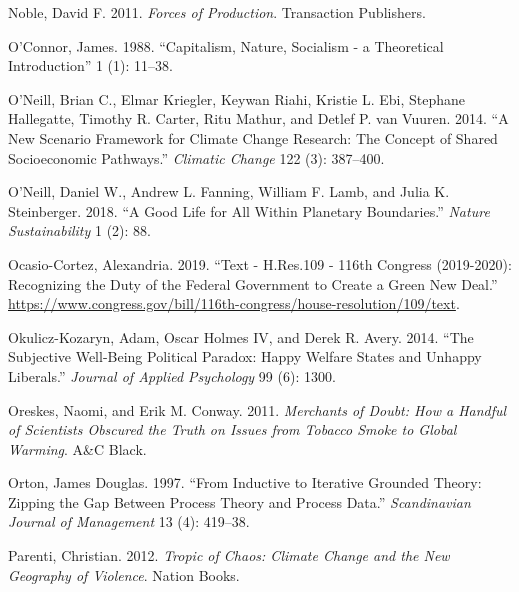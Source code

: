 \documentclass[a4paper, nobind]{templates/ociamthesis}
\newlength{\cslhangindent}
\newenvironment{CSLReferences}[2] %
 {%
  \setlength{\parindent}{0pt}
  \ifodd #1
  \let\oldpar\par
  \def\par{\hangindent=\cslhangindent\oldpar}
  \fi
  \setlength{\parskip}{1mm}
  \setlength{\baselineskip}{6mm}
 }%
 {}
\begin{document}
\begin{CSLReferences}{1}{0}
\leavevmode{}%
Noble, David F. 2011. \emph{Forces of {Production}}. {Transaction Publishers}.

\leavevmode{}%
O'Connor, James. 1988. {``Capitalism, Nature, Socialism - a Theoretical Introduction''} 1 (1): 11--38.

\leavevmode{}%
O'Neill, Brian C., Elmar Kriegler, Keywan Riahi, Kristie L. Ebi, Stephane Hallegatte, Timothy R. Carter, Ritu Mathur, and Detlef P. van Vuuren. 2014. {``A New Scenario Framework for Climate Change Research: The Concept of Shared Socioeconomic Pathways.''} \emph{Climatic Change} 122 (3): 387--400.

\leavevmode{}%
O'Neill, Daniel W., Andrew L. Fanning, William F. Lamb, and Julia K. Steinberger. 2018. {``A Good Life for All Within Planetary Boundaries.''} \emph{Nature Sustainability} 1 (2): 88.

\leavevmode{}%
Ocasio-Cortez, Alexandria. 2019. {``Text - {H}.{Res}.109 - 116th {Congress} (2019-2020): {Recognizing} the Duty of the {Federal Government} to Create a {Green New Deal}.''} \url{https://www.congress.gov/bill/116th-congress/house-resolution/109/text}.

\leavevmode{}%
Okulicz-Kozaryn, Adam, Oscar Holmes IV, and Derek R. Avery. 2014. {``The Subjective Well-Being Political Paradox: {Happy} Welfare States and Unhappy Liberals.''} \emph{Journal of Applied Psychology} 99 (6): 1300.

\leavevmode{}%
Oreskes, Naomi, and Erik M. Conway. 2011. \emph{Merchants of {Doubt}: {How} a {Handful} of {Scientists Obscured} the {Truth} on {Issues} from {Tobacco Smoke} to {Global Warming}}. {A\&C Black}.

\leavevmode{}%
Orton, James Douglas. 1997. {``From Inductive to Iterative Grounded Theory: {Zipping} the Gap Between Process Theory and Process Data.''} \emph{Scandinavian Journal of Management} 13 (4): 419--38.

\leavevmode{}%
Parenti, Christian. 2012. \emph{Tropic of {Chaos}: {Climate Change} and the {New Geography} of {Violence}}. {Nation Books}.


\end{CSLReferences}
\end{document}
